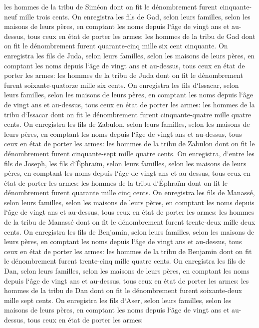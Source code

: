 \verse les hommes de la tribu de Siméon dont on fit le dénombrement furent cinquante-neuf mille trois cents. 
\verse On enregistra les fils de Gad, selon leurs familles, selon les maisons de leurs pères, en comptant les noms depuis l`âge de vingt ans et au-dessus, tous ceux en état de porter les armes: 
\verse les hommes de la tribu de Gad dont on fit le dénombrement furent quarante-cinq mille six cent cinquante. 
\verse On enregistra les fils de Juda, selon leurs familles, selon les maisons de leurs pères, en comptant les noms depuis l`âge de vingt ans et au-dessus, tous ceux en état de porter les armes: 
\verse les hommes de la tribu de Juda dont on fit le dénombrement furent soixante-quatorze mille six cents. 
\verse On enregistra les fils d`Issacar, selon leurs familles, selon les maisons de leurs pères, en comptant les noms depuis l`âge de vingt ans et au-dessus, tous ceux en état de porter les armes: 
\verse les hommes de la tribu d`Issacar dont on fit le dénombrement furent cinquante-quatre mille quatre cents. 
\verse On enregistra les fils de Zabulon, selon leurs familles, selon les maisons de leurs pères, en comptant les noms depuis l`âge de vingt ans et au-dessus, tous ceux en état de porter les armes: 
\verse les hommes de la tribu de Zabulon dont on fit le dénombrement furent cinquante-sept mille quatre cents. 
\verse On enregistra, d`entre les fils de Joseph, les fils d`Éphraïm, selon leurs familles, selon les maisons de leurs pères, en comptant les noms depuis l`âge de vingt ans et au-dessus, tous ceux en état de porter les armes: 
\verse les hommes de la tribu d`Éphraïm dont on fit le dénombrement furent quarante mille cinq cents. 
\verse On enregistra les fils de Manassé, selon leurs familles, selon les maisons de leurs pères, en comptant les noms depuis l`âge de vingt ans et au-dessus, tous ceux en état de porter les armes: 
\verse les hommes de la tribu de Manassé dont on fit le dénombrement furent trente-deux mille deux cents. 
\verse On enregistra les fils de Benjamin, selon leurs familles, selon les maisons de leurs pères, en comptant les noms depuis l`âge de vingt ans et au-dessus, tous ceux en état de porter les armes: 
\verse les hommes de la tribu de Benjamin dont on fit le dénombrement furent trente-cinq mille quatre cents. 
\verse On enregistra les fils de Dan, selon leurs familles, selon les maisons de leurs pères, en comptant les noms depuis l`âge de vingt ans et au-dessus, tous ceux en état de porter les armes: 
\verse les hommes de la tribu de Dan dont on fit le dénombrement furent soixante-deux mille sept cents. 
\verse On enregistra les fils d`Aser, selon leurs familles, selon les maisons de leurs pères, en comptant les noms depuis l`âge de vingt ans et au-dessus, tous ceux en état de porter les armes: 
